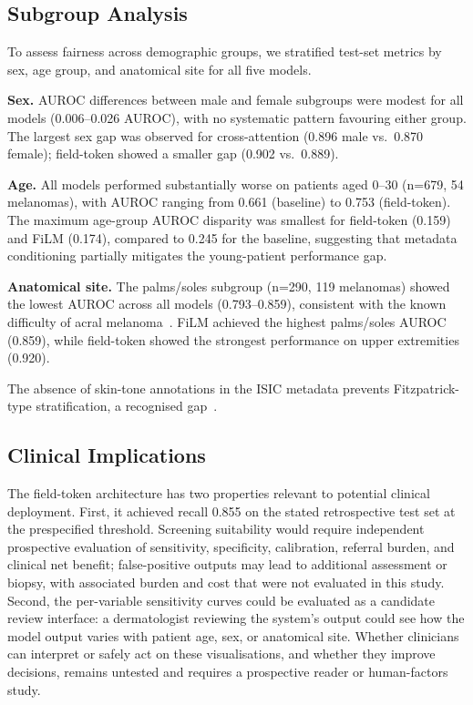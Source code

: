 \documentclass[12pt, a4paper]{article}
\begin{document}
\subsection{Subgroup Analysis}

To assess fairness across demographic groups, we stratified test-set metrics by sex, age group, and anatomical site for all five models.

\textbf{Sex.} AUROC differences between male and female subgroups were modest for all models (0.006--0.026 AUROC), with no systematic pattern favouring either group. The largest sex gap was observed for cross-attention (0.896 male vs.\ 0.870 female); field-token showed a smaller gap (0.902 vs.\ 0.889).

\textbf{Age.} All models performed substantially worse on patients aged 0--30 (n=679, 54 melanomas), with AUROC ranging from 0.661 (baseline) to 0.753 (field-token). The maximum age-group AUROC disparity was smallest for field-token (0.159) and FiLM (0.174), compared to 0.245 for the baseline, suggesting that metadata conditioning partially mitigates the young-patient performance gap.

\textbf{Anatomical site.} The palms/soles subgroup (n=290, 119 melanomas) showed the lowest AUROC across all models (0.793--0.859), consistent with the known difficulty of acral melanoma~\citep{bradford2009acral}. FiLM achieved the highest palms/soles AUROC (0.859), while field-token showed the strongest performance on upper extremities (0.920).

The absence of skin-tone annotations in the ISIC metadata prevents Fitzpatrick-type stratification, a recognised gap~\citep{groh2024deep}.

\subsection{Clinical Implications}

The field-token architecture has two properties relevant to potential clinical deployment. First, it achieved recall 0.855 on the stated retrospective test set at the prespecified threshold. Screening suitability would require independent prospective evaluation of sensitivity, specificity, calibration, referral burden, and clinical net benefit; false-positive outputs may lead to additional assessment or biopsy, with associated burden and cost that were not evaluated in this study. Second, the per-variable sensitivity curves could be evaluated as a candidate review interface: a dermatologist reviewing the system's output could see how the model output varies with patient age, sex, or anatomical site. Whether clinicians can interpret or safely act on these visualisations, and whether they improve decisions, remains untested and requires a prospective reader or human-factors study.
\end{document}
